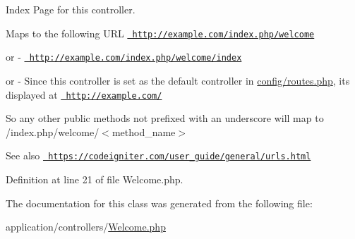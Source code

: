 Index Page for this controller.

Maps to the following U\+RL \href{http://example.com/index.php/welcome}{\texttt{ http\+://example.\+com/index.\+php/welcome}}
\begin{DoxyItemize}
\item or -\/ \href{http://example.com/index.php/welcome/index}{\texttt{ http\+://example.\+com/index.\+php/welcome/index}}
\item or -\/ Since this controller is set as the default controller in \mbox{\hyperlink{routes_8php}{config/routes.\+php}}, it\textquotesingle{}s displayed at \href{http://example.com/}{\texttt{ http\+://example.\+com/}}
\end{DoxyItemize}

So any other public methods not prefixed with an underscore will map to /index.php/welcome/$<$method\+\_\+name$>$ \begin{DoxySeeAlso}{See also}
\href{https://codeigniter.com/user_guide/general/urls.html}{\texttt{ https\+://codeigniter.\+com/user\+\_\+guide/general/urls.\+html}} 
\end{DoxySeeAlso}


Definition at line 21 of file Welcome.\+php.



The documentation for this class was generated from the following file\+:\begin{DoxyCompactItemize}
\item 
application/controllers/\mbox{\hyperlink{_welcome_8php}{Welcome.\+php}}\end{DoxyCompactItemize}
